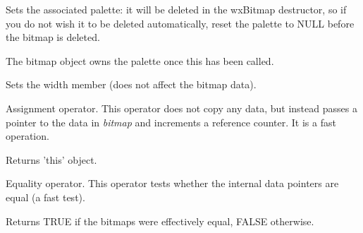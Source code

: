 
Sets the associated palette: it will be deleted in the wxBitmap
destructor, so if you do not wish it to be deleted automatically,
reset the palette to NULL before the bitmap is deleted.




The bitmap object owns the palette once this has been called.





Sets the width member (does not affect the bitmap data).





Assignment operator. This operator does not copy any data, but instead
passes a pointer to the data in {\it bitmap} and increments a reference
counter. It is a fast operation.




Returns 'this' object.



Equality operator. This operator tests whether the internal data pointers are
equal (a fast test).




Returns TRUE if the bitmaps were effectively equal, FALSE otherwise.



